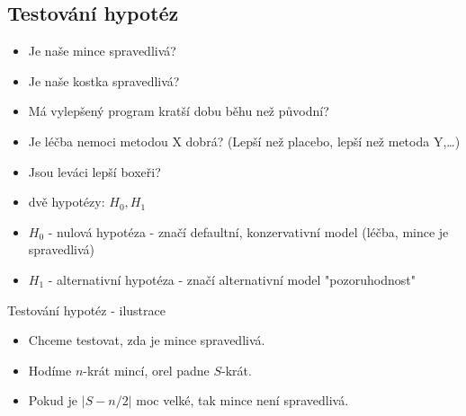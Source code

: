 \documentclass[../main.tex]{subfiles}
\begin{document}
\subsection{Testování hypotéz}
\begin{itemize}
    \item Je naše mince spravedlivá?
    \item Je naše kostka spravedlivá?
    \item Má vylepšený program kratší dobu běhu než původní?
    \item Je léčba nemoci metodou X dobrá? (Lepší než placebo, lepší než metoda Y,\dots)
    \item Jsou leváci lepší boxeři?
\end{itemize}
\begin{itemize}
    \item dvě hypotézy: $H_0,H_1$
    \item $H_0$ - nulová hypotéza - značí defaultní, konzervativní model (léčba, mince je spravedlivá)
    \item $H_1$ - alternativní hypotéza - značí alternativní model "pozoruhodnost"
\end{itemize}
Testování hypotéz - ilustrace
\begin{itemize}
    \item Chceme testovat, zda je mince spravedlivá.
    \item Hodíme $n$-krát mincí, orel padne $S$-krát.
    \item Pokud je $|S-n/2|$ moc velké, tak mince není spravedlivá.
\end{itemize}
\end{document}
